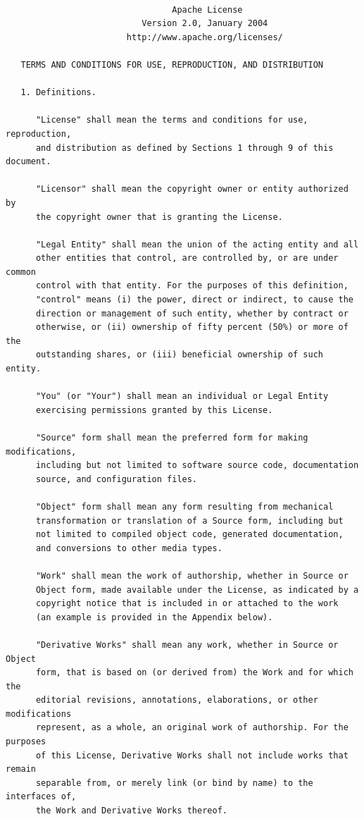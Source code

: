\documentclass[10pt, headsepline,DIV14,BCOR0.5cm]{scrreprt}
\begin{document}
\footnotesize
\begin{lstlisting}

                                 Apache License
                           Version 2.0, January 2004
                        http://www.apache.org/licenses/

   TERMS AND CONDITIONS FOR USE, REPRODUCTION, AND DISTRIBUTION

   1. Definitions.

      "License" shall mean the terms and conditions for use, reproduction,
      and distribution as defined by Sections 1 through 9 of this document.

      "Licensor" shall mean the copyright owner or entity authorized by
      the copyright owner that is granting the License.

      "Legal Entity" shall mean the union of the acting entity and all
      other entities that control, are controlled by, or are under common
      control with that entity. For the purposes of this definition,
      "control" means (i) the power, direct or indirect, to cause the
      direction or management of such entity, whether by contract or
      otherwise, or (ii) ownership of fifty percent (50%) or more of the
      outstanding shares, or (iii) beneficial ownership of such entity.

      "You" (or "Your") shall mean an individual or Legal Entity
      exercising permissions granted by this License.

      "Source" form shall mean the preferred form for making modifications,
      including but not limited to software source code, documentation
      source, and configuration files.

      "Object" form shall mean any form resulting from mechanical
      transformation or translation of a Source form, including but
      not limited to compiled object code, generated documentation,
      and conversions to other media types.

      "Work" shall mean the work of authorship, whether in Source or
      Object form, made available under the License, as indicated by a
      copyright notice that is included in or attached to the work
      (an example is provided in the Appendix below).

      "Derivative Works" shall mean any work, whether in Source or Object
      form, that is based on (or derived from) the Work and for which the
      editorial revisions, annotations, elaborations, or other modifications
      represent, as a whole, an original work of authorship. For the purposes
      of this License, Derivative Works shall not include works that remain
      separable from, or merely link (or bind by name) to the interfaces of,
      the Work and Derivative Works thereof.


\end{lstlisting}
\end{document}
